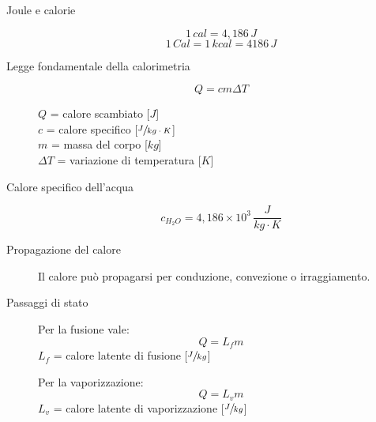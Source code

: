 \documentclass[a4paper,11pt,italian]{article}
\begin{document}
\begin{description}
  \item[Joule e calorie] 
  \[ 1 \, cal = 4,186 \, J \] \[ 1 \, Cal = 1 \, kcal = 4186 \, J \]
  
  \item[Legge fondamentale della calorimetria]
  \[ Q = cm \Delta T \]
  \begin{multicols}{2}
  $ Q $ = calore scambiato [$ J $]\\
  $ c $ = calore specifico [$ \sfrac{J}{kg\cdot K} $]\\
  $ m $ = massa del corpo [$ kg $]\\
  $ \Delta T $ = variazione di temperatura [$ K $]
  \end{multicols}
  
  \item[Calore specifico dell'acqua] 
  \[ c_{H_2O} = 4,186 \times 10^3 \, \frac{J}{kg \cdot K}\]

  
  \item[Propagazione del calore] 
  Il calore può propagarsi per conduzione, convezione o irraggiamento.

  
  \item[Passaggi di stato] 
  Per la fusione vale:
  \[ Q = L_f m \]
  $ L_f $ = calore latente di fusione [$ \sfrac{J}{kg} $]
  
  Per la vaporizzazione:
  \[ Q = L_v m \]
  $ L_v $ = calore latente di vaporizzazione [$ \sfrac{J}{kg} $]
\end{description}
\end{document}
